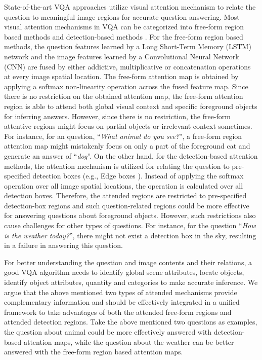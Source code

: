 \documentclass[letterpaper]{article}
\begin{document}
State-of-the-art VQA approaches utilize visual attention mechanism to relate the question to meaningful image regions for accurate question answering. Most visual attention mechanisms in VQA can be categorized into free-form region based methods \cite{lu2016hierarchical,fukui2016multimodal} and detection-based methods \cite{li2016visual,shih2016look}. For the free-form region based methods, the question features learned by a Long Short-Term Memory (LSTM) network and the image features learned by a Convolutional Neural Network (CNN) are fused by either addictive, multiplicative or concatenation operations at every image spatial location. The free-form attention map is obtained by applying a softmax non-linearity operation across the fused feature map. Since there is no restriction on the obtained attention map, the free-form attention region is able to attend both global visual context and specific foreground objects for inferring answers. However, since there is no restriction, the free-form attentive regions might focus on partial objects or irrelevant context sometimes. For instance, for an question, ``\textit{What animal do you see?}'', a free-form region attention map might mistakenly focus on only a part of the foreground cat and generate an answer of ``\textit{dog}''. On the other hand, for the detection-based attention methods, the attention mechanism is utilized for relating the question to pre-specified detection boxes (e.g., Edge boxes \cite{zitnick2014edge}). Instead of applying the softmax operation over all image spatial locations, the operation is calculated over all detection boxes. Therefore, the attended regions are restricted to pre-specified detection-box regions and such question-related regions could be more effective for answering questions about foreground objects. However, such restrictions also cause challenges for other types of questions. For instance, for the question ``\textit{How is the weather today?}'', there might not exist a detection box in the sky, resulting in a failure in answering this question. 


For better understanding the question and image contents and their relations, a good VQA algorithm needs to identify global scene attributes, locate objects, identify object attributes, quantity and categories to make accurate inference. We argue that the above mentioned two types of attended mechanisms provide complementary information and should be effectively integrated in a unified framework to take advantages of both the attended free-form regions and attended detection regions. Take the above mentioned two questions as examples, the question about animal could be more effectively answered with detection-based attention maps, while the question about the weather can be better answered with the free-form region based attention maps.
\end{document}
